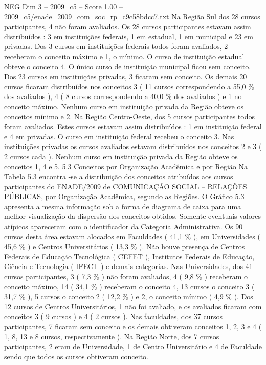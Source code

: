 \begin{textsample}{NEG Dim 3 – 2009\_c5 – Score 1.00 – 2009\_c5/enade\_2009\_com\_soc\_rp\_c9c58bdcc7.txt}
Na Região Sul dos 28 cursos participantes, 4 não foram avaliados.
Os 28 cursos participantes estavam assim distribuídos : 3 em instituições federais, 1 em estadual, 1 em municipal e 23 em privadas.
Dos 3 cursos em instituições federais todos foram avaliados, 2 receberam o conceito máximo e 1, o mínimo.
O curso de instituição estadual obteve o conceito 4.
O único curso de instituição municipal ficou sem conceito.
Dos 23 cursos em instituições privadas, 3 ficaram sem conceito.
Os demais 20 cursos ficaram distribuídos nos conceitos 3 ( 11 cursos correspondendo a 55,0 \% dos avaliados ), 4 ( 8 cursos correspondendo a 40,0 \% dos avaliados ) e 1 no conceito máximo.
Nenhum curso em instituição privada da Região obteve os conceitos mínimo e 2.
Na Região Centro-Oeste, dos 5 cursos participantes todos foram avaliados.
Estes cursos estavam assim distribuídos : 1 em instituição federal e 4 em privadas.
O curso em instituição federal recebeu o conceito 3.
Nas instituições privadas os cursos avaliados estavam distribuídos nos conceitos 2 e 3 ( 2 cursos cada ).
Nenhum curso em instituição privada da Região obteve os conceitos 1, 4 e 5. 5.3 Conceitos por Organização Acadêmica e por Região Na Tabela 5.3 encontra -se a distribuição dos conceitos atribuídos aos cursos participantes do ENADE/2009 de COMUNICAÇÃO SOCIAL – RELAÇÕES PÚBLICAS, por Organização Acadêmica, segundo as Regiões.
O Gráfico 5.3 apresenta a mesma informação sob a forma de diagrama de caixa para uma melhor visualização da dispersão dos conceitos obtidos.
Somente eventuais valores atípicos apareceram com o identificador da Categoria Administrativa.
Os 90 cursos desta área estavam alocados em Faculdades ( 41,1 \% ), em Universidades ( 45,6 \% ) e Centros Universitários ( 13,3 \% ).
Não houve presença de Centros Federais de Educação Tecnológica ( CEFET ), Institutos Federais de Educação, Ciência e Tecnologia ( IFECT ) e demais categorias.
Nas Universidades, dos 41 cursos participantes, 3 ( 7,3 \% ) não foram avaliados, 4 ( 9,8 \% ) receberam o conceito máximo, 14 ( 34,1 \% ) receberam o conceito 4, 13 cursos o conceito 3 ( 31,7 \% ), 5 cursos o conceito 2 ( 12,2 \% ) e 2, o conceito mínimo ( 4,9 \% ).
Dos 12 cursos de Centros Universitários, 1 não foi avaliado, e os avaliados ficaram com conceitos 3 ( 9 cursos ) e 4 ( 2 cursos ).
Nas faculdades, dos 37 cursos participantes, 7 ficaram sem conceito e os demais obtiveram conceitos 1, 2, 3 e 4 ( 1, 8, 13 e 8 cursos, respectivamente ).
Na Região Norte, dos 7 cursos participantes, 2 eram de Universidade, 1 de Centro Universitário e 4 de Faculdade sendo que todos os cursos obtiveram conceito.

\end{textsample}
